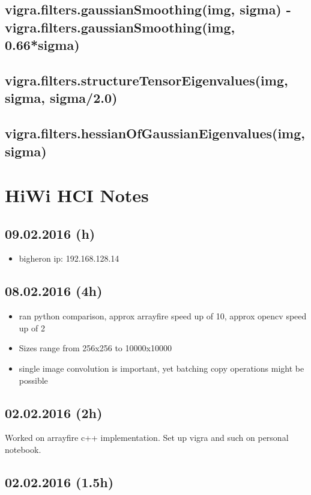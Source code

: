 \documentclass[12pt,a4paper]{article}
\begin{document}
  \subsection{vigra.filters.gaussianSmoothing(img, sigma) - vigra.filters.gaussianSmoothing(img, 0.66*sigma)}
  \subsection{vigra.filters.structureTensorEigenvalues(img, sigma, sigma/2.0)}
  \subsection{vigra.filters.hessianOfGaussianEigenvalues(img, sigma)}


\section{HiWi HCI Notes}

\subsection{09.02.2016 (h)}
  \begin{itemize}
    \item bigheron ip: 192.168.128.14
  \end{itemize}
  

\subsection{08.02.2016 (4h)}
  \begin{itemize}
    \item ran python comparison, approx arrayfire speed up of 10, approx opencv speed up of 2
    \item Sizes range from 256x256 to 10000x10000
    \item single image convolution is important, yet batching copy operations might be possible
  \end{itemize}
  

\subsection{02.02.2016 (2h)}
  Worked on arrayfire c++ implementation. Set up vigra and such on personal notebook.

\subsection{02.02.2016 (1.5h)}
\end{document}
